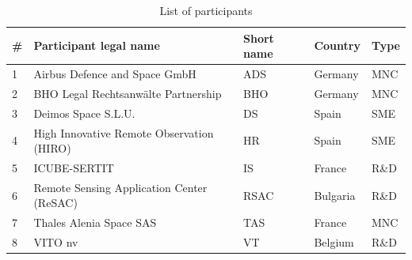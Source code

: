 \begin{table}[H]
	\centering
	\begin{tabular}{p{1cm} >{\raggedright\arraybackslash}p{5.7cm} p{2cm} p{2cm} p{2cm}}
		
		\toprule[2pt]
		
		\textbf{\#} & \textbf{Participant legal name} & \textbf{Short name} & \textbf{Country} & \textbf{Type}\\
		
		\midrule[1.5pt] 
		
		1 & Airbus Defence and Space GmbH & ADS & Germany & MNC \vspace{0.2cm}\\
		
		\midrule
		
		2 & BHO Legal Rechtsanwälte Partnership & BHO & Germany & MNC \vspace{0.2cm}\\
		
		\midrule
		
		3 & Deimos Space S.L.U. & DS & Spain & SME \vspace{0.2cm}\\
		
		\midrule
		
		4 & High Innovative Remote Observation (HIRO) & HR & Spain & SME \vspace{0.2cm}\\
		
		\midrule
		
		5 & ICUBE-SERTIT & IS & France & R\&D \vspace{0.2cm}\\
		
		\midrule
		
		6 & Remote Sensing Application Center (ReSAC) & RSAC & Bulgaria & R\&D \vspace{0.2cm}\\
		
		\midrule
		
		7 & Thales Alenia Space SAS & TAS & France & MNC \vspace{0.2cm}\\
		
		\midrule
		
		8 & VITO nv & VT & Belgium & R\&D \vspace{0.2cm}\\
		
		\bottomrule[2pt]
		
	\end{tabular}
	\caption{List of participants}
	\label{participants}
\end{table}




